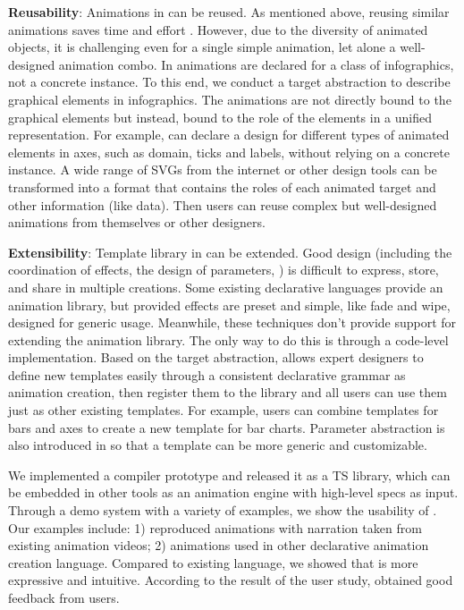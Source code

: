 \textbf{Reusability}: Animations in \gaia{} can be reused.
As mentioned above, reusing similar animations saves time and effort \cite{katika}.
However, due to the diversity of animated objects, it is challenging even for a single simple animation, let alone a well-designed animation combo.
In \gaia{} animations are declared for a class of infographics, not a concrete instance.
To this end, we conduct a target abstraction to describe graphical elements in infographics.
The animations are not directly bound to the graphical elements but instead, bound to the role of the elements in a unified representation.
For example, \gaia{} can declare a design for different types of animated elements in axes, such as domain, ticks and labels, without relying on a concrete instance.
A wide range of SVGs from the internet or other design tools can be transformed into a format that contains the roles of each animated target and other information (like data). 
Then users can reuse complex but well-designed animations from themselves or other designers.

\textbf{Extensibility}: Template library in \gaia{} can be extended.
Good design (including the coordination of effects, the design of parameters, \etcns) is difficult to express, store, and share in multiple creations.
Some existing declarative languages provide an animation library, but provided effects are preset and simple, like fade and wipe, designed for generic usage.
Meanwhile, these techniques don't provide support for extending the animation library. The only way to do this is through a code-level implementation.
Based on the target abstraction, \gaia{} allows expert designers to define new templates easily through a consistent declarative grammar as animation creation, then register them to the library and all users can use them just as other existing templates. 
For example, users can combine templates for bars and axes to create a new template for bar charts. 
Parameter abstraction is also introduced in \gaia{} so that a template can be more generic and customizable.

We implemented a \gaia{} compiler prototype and released it as a TS library, which can be embedded in other tools as an animation engine with high-level specs as input.
Through a demo system with a variety of examples, we show the usability of \gaia{}. Our examples include: 1) reproduced animations with narration taken from existing animation videos; 2) animations used in other declarative animation creation language.
Compared to existing language, we showed that \gaia{} is more expressive and intuitive.
According to the result of the user study, \gaia{} obtained good feedback from users.

